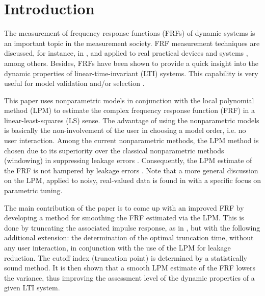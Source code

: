 

\section{Introduction}

The measurement of frequency response functions (FRFs) of dynamic systems is an important topic in the measurement society.  FRF measurement techniques are discussed, for instance, in 
\cite{Schoukens1998ImprFRFmeas,schoukens2006leakagereduction,guillaume1996,broersen1995transferfunction,pintelon2010lpm1,Antoni20071723,FDidentEd2Pintelon}, and applied to real practical devices and systems \cite{Lim2010,Robinson1990,Behjat2010}, among others. Besides, FRFs have been shown to provide a quick insight into the dynamic properties of linear-time-invariant (LTI) systems. This capability is very useful for model validation and/or selection \cite{FDidentEd2Pintelon}.

This paper uses nonparametric models in conjunction with the local polynomial method (LPM) \cite{pintelon2010lpm1} to estimate the complex frequency response function (FRF) in a linear-least-squares (LS) sense. The advantage of using the nonparametric models is basically the non-involvement of the user in choosing a model order, i.e. no user interaction. Among the current nonparametric methods, the LPM method is chosen due to its superiority over the classical nonparametric methods (windowing) in suppressing leakage errors \cite{bendatPiersol1993,Oppenheim1983}. Consequently, the LPM estimate of the FRF is not hampered by leakage errors \cite{pintelon2010lpm1,schoukens2010nonparametric}. Note that a more general discussion on the LPM, applied to noisy, real-valued data is found in \cite{fanGijbels1996LPM} with a specific focus on parametric tuning.

The main contribution of the paper is to come up with an improved FRF by developing a method for smoothing the FRF estimated via the LPM. This is done by truncating the associated impulse response, as in \cite{Schoukens1998ImprFRFmeas}, but with the following additional extension: the determination of the optimal truncation time, without any user interaction, in conjunction with the use of the LPM for leakage reduction. The cutoff index (truncation point) is determined by a statistically sound method. It is then shown that a smooth LPM estimate of the FRF lowers the variance, thus improving the assessment level of the dynamic properties of a given LTI system. 

